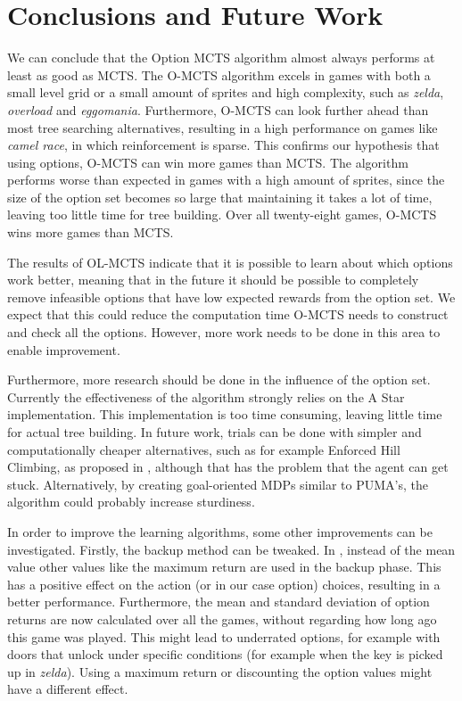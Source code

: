 \section{Conclusions and Future Work}
\label{sec:conclusion}
We can conclude that the Option MCTS algorithm almost always performs at least
as good as MCTS. The O-MCTS algorithm excels in games with both a small level
grid or a small amount of sprites and high complexity, such as \textit{zelda},
\textit{overload} and \textit{eggomania}.  Furthermore, O-MCTS can look further
ahead than most tree searching alternatives, resulting in a high performance on
games like \textit{camel race}, in which reinforcement is sparse. This confirms
our hypothesis that using options, O-MCTS can win more games than MCTS. The
algorithm performs worse than expected in games with a high amount of sprites,
since the size of the option set becomes so large that maintaining it takes a
lot of time, leaving too little time for tree building. Over all twenty-eight
games, O-MCTS wins more games than MCTS.

The results of OL-MCTS indicate that it is possible to learn about which options
work better, meaning that in the future it should be possible to completely
remove infeasible options that have low expected rewards from the option set. We
expect that this could reduce the computation time O-MCTS needs to construct and
check all the options. However, more work needs to be done in this area to
enable improvement.

Furthermore, more research should be done in the influence of the option set.
Currently the effectiveness of the algorithm strongly relies on the A Star
implementation. This implementation is too time consuming, leaving
little time for actual tree building. In future work, trials can be done with
simpler and computationally cheaper alternatives, such as for example Enforced
Hill Climbing, as proposed in \cite{ross2014general}, although that has the
problem that the agent can get stuck. Alternatively, by creating goal-oriented
MDPs similar to PUMA's, the algorithm could probably increase sturdiness.

In order to improve the learning algorithms, some other improvements can be
investigated. Firstly, the backup method can be tweaked. In
\cite{coulom2007efficient}, instead of the mean value other values like the
maximum return are used in the backup phase. This has a positive effect on the
action (or in our case option) choices, resulting in a better performance.
Furthermore, the mean and standard deviation of option returns are now
calculated over all the games, without regarding how long ago this game was
played. This might lead to underrated options, for example with doors that
unlock under specific conditions (for example when the key is picked up in
\textit{zelda}).  Using a maximum return or discounting the option values might
have a different effect.

